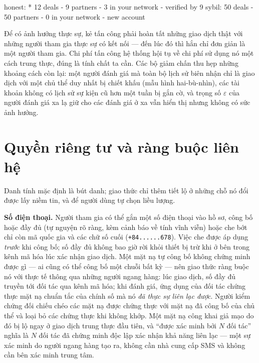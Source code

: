 \documentclass[11pt]{article}
\begin{document}
\begin{code}
honest:  * 12 deals - 9 partners - 3 in your network
           - verified by 9
sybil:   50 deals - 50 partners - 0 in your network
           - new account
\end{code}

Để có ảnh hưởng thực sự, kẻ tấn công phải hoàn tất những giao dịch thật với
những người tham gia thực sự có kết nối --- đến lúc đó thì hắn chỉ đơn giản là
một người tham gia. Chi phí tấn công hệ thống hội tụ về chi phí sử dụng nó một
cách trung thực, đúng là tính chất ta cần. Các bộ giảm chấn thu hẹp những
khoảng cách còn lại: một người đánh giá mà toàn bộ lịch sử biên nhận chỉ là
giao dịch với một chủ thể duy nhất bị chiết khấu (mẫu hình hai-bù-nhìn), các
tài khoản không có lịch sử sự kiện cũ hơn một tuần bị gắn cờ, và trọng số
$\varepsilon$ của người đánh giá xa lạ giữ cho các đánh giá ở xa vẫn hiển thị
nhưng không có sức ảnh hưởng.

\section{Quyền riêng tư và ràng buộc liên hệ}
\label{sec:privacy}

Danh tính mặc định là bút danh; giao thức chỉ thêm tiết lộ ở những chỗ nó đổi
được lấy niềm tin, và để người dùng tự chọn liều lượng.

\textbf{Số điện thoại.} Người tham gia có thể gắn một số điện thoại vào hồ sơ,
công bố hoặc đầy đủ (tự nguyện rõ ràng, kèm cảnh báo về tính vĩnh viễn) hoặc
che bớt chỉ còn mã quốc gia và các chữ số cuối
(\texttt{+84......678}). Việc che được áp dụng \emph{trước} khi công bố; số
đầy đủ không bao giờ rời khỏi thiết bị trừ khi ở bên trong kênh mã hóa lúc xác
nhận giao dịch. Một mặt nạ tự công bố không chứng minh được gì --- ai cũng có
thể công bố một chuỗi bất kỳ --- nên giao thức ràng buộc nó với thực tế thông
qua những người ngang hàng: lúc giao dịch, số đầy đủ truyền tới đối tác qua
kênh mã hóa; khi đánh giá, ứng dụng của đối tác chứng thực mặt nạ chuẩn tắc
của chính số mà nó \emph{đã thực sự liên lạc được}. Người kiểm chứng đối chiếu
chéo các mặt nạ được chứng thực với mặt nạ đã công bố của chủ thể và loại bỏ
các chứng thực khi không khớp. Một mặt nạ công khai giả mạo do đó bị lộ ngay
ở giao dịch trung thực đầu tiên, và ``được xác minh bởi $N$ đối tác'' nghĩa là
$N$ đối tác đã chứng minh độc lập xác nhận khả năng liên lạc --- một sự xác
minh do người ngang hàng tạo ra, không cần nhà cung cấp SMS và không cần bên
xác minh trung tâm.
\end{document}
